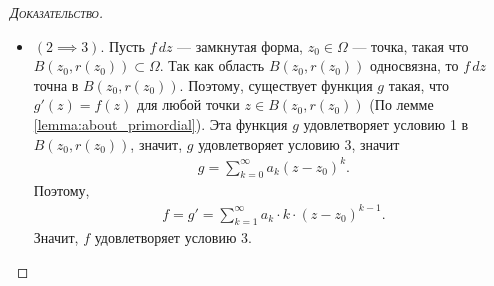 \documentclass[../complex-analysis.tex]{subfiles}
\begin{document}
\begin{proof}[\normalfont\textsc{Доказательство}]
\begin{itemize}
\item $ (2 \implies 3) $. Пусть $ f\,dz $ --- замкнутая форма, $ z_0 \in \Omega $ --- точка, такая что $ B(z_0, r(z_0)) \subset \Omega $. Так как область $ B(z_0, r(z_0)) $ односвязна, то $ f\,dz $ точна в $ B(z_0, r(z_0)) $. Поэтому, существует функция $ g $ такая, что $ g'(z) = f(z) $ для любой точки $ z \in B(z_0, r(z_0)) $ (По лемме \ref{lemma:about_primordial}). Эта функция $ g $ удовлетворяет условию 1 в $ B(z_0, r(z_0)) $, значит, $ g $ удовлетворяет условию $ 3 $, значит
 \begin{align*}
  g = \sum_{k=0}^{\infty}a_k(z-z_0)^{k}.
 \end{align*} Поэтому,
 \begin{align*}
  f = g' = \sum_{k=1}^{\infty}a_k \cdot k \cdot (z-z_0)^{k-1}.
 \end{align*} Значит, $ f $ удовлетворяет условию 3. 
 \end{itemize}
\end{proof}
\end{document}
